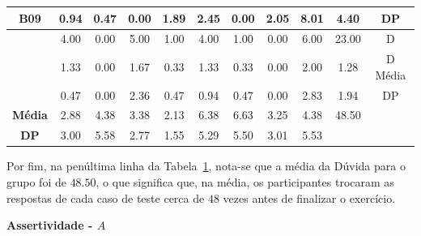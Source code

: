 \begin{table}[htbp]
\begin{tabular}{|c|c|c|c|c|c|c|c|c|cc}
		\multirow{-3}{*}{\cellcolor[HTML]{F2F2F2}\textbf{B09}} & 0.94 & 0.47 & 0.00 & 1.89 & 2.45 & 0.00 & 2.05 & 8.01 & \multicolumn{1}{c|}{4.40} & \multicolumn{1}{c|}{DP} \\ \hline
		\rowcolor[HTML]{D9D9D9} 
		\cellcolor[HTML]{F2F2F2} & 4.00 & 0.00 & 5.00 & 1.00 & 4.00 & 1.00 & 0.00 & 6.00 & \multicolumn{1}{c|}{\cellcolor[HTML]{D9D9D9}23.00} & \multicolumn{1}{c|}{\cellcolor[HTML]{D9D9D9}D} \\ \cline{2-11} 
		\cellcolor[HTML]{F2F2F2} & 1.33 & 0.00 & 1.67 & 0.33 & 1.33 & 0.33 & 0.00 & 2.00 & \multicolumn{1}{c|}{1.28} & \multicolumn{1}{c|}{D Média} \\ \cline{2-11} 
		\rowcolor[HTML]{D9D9D9} 
		\multirow{-3}{*}{\cellcolor[HTML]{F2F2F2}\textbf{B10}} & 0.47 & 0.00 & 2.36 & 0.47 & 0.94 & 0.47 & 0.00 & 2.83 & \multicolumn{1}{c|}{\cellcolor[HTML]{D9D9D9}1.94} & \multicolumn{1}{c|}{\cellcolor[HTML]{D9D9D9}DP} \\ \hline
		\textbf{Média} & 2.88 & 4.38 & 3.38 & 2.13 & 6.38 & 6.63 & 3.25 & 4.38 & \multicolumn{1}{c|}{48.50} & \multicolumn{1}{l}{} \\ \cline{1-10}
		\cellcolor[HTML]{D9D9D9}\textbf{DP} & \cellcolor[HTML]{D9D9D9}3.00 & \cellcolor[HTML]{D9D9D9}5.58 & \cellcolor[HTML]{D9D9D9}2.77 & \cellcolor[HTML]{D9D9D9}1.55 & \cellcolor[HTML]{D9D9D9}5.29 & \cellcolor[HTML]{D9D9D9}5.50 & \cellcolor[HTML]{D9D9D9}3.01 & \cellcolor[HTML]{D9D9D9}5.53 & \multicolumn{1}{l}{} & \multicolumn{1}{l}{} \\ \cline{1-9}
	\end{tabular}
	\label{tab:F3_A2_D_CASOS_}
\end{table}

Por fim, na penúltima linha da Tabela~\ref{tab:F3_A2_D_CASOS_}, nota-se que a média da Dúvida para o grupo foi de $48.50$, o que significa que, na média, os participantes trocaram as respostas de cada caso de teste cerca de $48$ vezes antes de finalizar o exercício.


\textbf{Assertividade - $A$}

